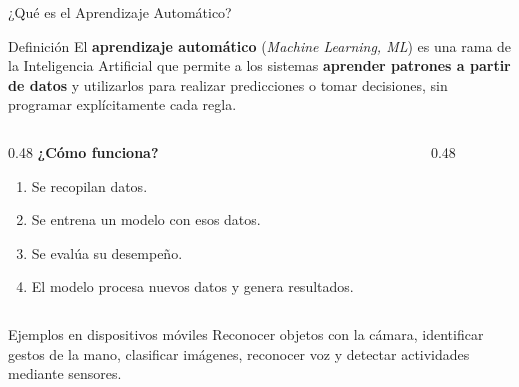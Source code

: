 \documentclass[aspectratio=169]{beamer}
\begin{document}
\begin{frame}{¿Qué es el Aprendizaje Automático?}
\small

\begin{block}{Definición}
El \textbf{aprendizaje automático} (\textit{Machine Learning, ML}) es una
rama de la Inteligencia Artificial que permite a los sistemas
\textbf{aprender patrones a partir de datos} y utilizarlos para realizar
predicciones o tomar decisiones, sin programar explícitamente cada regla.
\end{block}

\vspace{0.2cm}

\begin{columns}[T,onlytextwidth]
    \begin{column}{0.48\textwidth}
        \textbf{¿Cómo funciona?}
        \begin{enumerate}
            \item Se recopilan datos.
            \item Se entrena un modelo con esos datos.
            \item Se evalúa su desempeño.
            \item El modelo procesa nuevos datos y genera resultados.
        \end{enumerate}
    \end{column}

    \begin{column}{0.48\textwidth}
        \centering
    \end{column}
\end{columns}

\vspace{0.2cm}

\begin{alertblock}{Ejemplos en dispositivos móviles}
Reconocer objetos con la cámara, identificar gestos de la mano,
clasificar imágenes, reconocer voz y detectar actividades mediante sensores.
\end{alertblock}

\end{frame}
\end{document}
